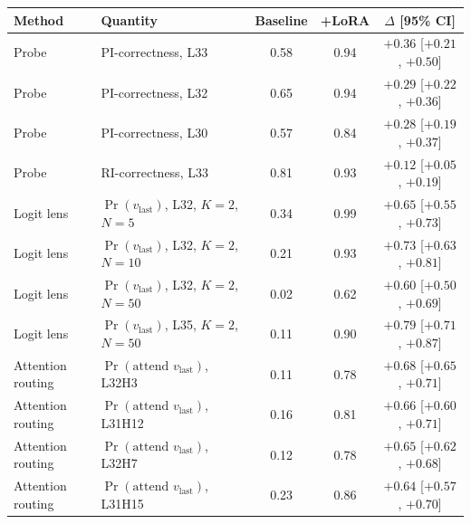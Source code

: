 \begin{tabular}{llccc}
\toprule
\textbf{Method} & \textbf{Quantity} & \textbf{Baseline} & \textbf{+LoRA} & \textbf{$\Delta$ [95\% CI]} \\
\midrule
Probe & PI-correctness, L33 & 0.58 & 0.94 & $+0.36$ [$+0.21$, $+0.50$] \\
Probe & PI-correctness, L32 & 0.65 & 0.94 & $+0.29$ [$+0.22$, $+0.36$] \\
Probe & PI-correctness, L30 & 0.57 & 0.84 & $+0.28$ [$+0.19$, $+0.37$] \\
Probe & RI-correctness, L33 & 0.81 & 0.93 & $+0.12$ [$+0.05$, $+0.19$] \\
\midrule
Logit lens & $\Pr(v_{\text{last}})$, L32, $K{=}2$, $N{=}5$  & 0.34 & 0.99 & $+0.65$ [$+0.55$, $+0.73$] \\
Logit lens & $\Pr(v_{\text{last}})$, L32, $K{=}2$, $N{=}10$ & 0.21 & 0.93 & $+0.73$ [$+0.63$, $+0.81$] \\
Logit lens & $\Pr(v_{\text{last}})$, L32, $K{=}2$, $N{=}50$ & 0.02 & 0.62 & $+0.60$ [$+0.50$, $+0.69$] \\
Logit lens & $\Pr(v_{\text{last}})$, L35, $K{=}2$, $N{=}50$ & 0.11 & 0.90 & $+0.79$ [$+0.71$, $+0.87$] \\
\midrule
Attention routing & $\Pr(\text{attend } v_{\text{last}})$, L32H3  & 0.11 & 0.78 & $+0.68$ [$+0.65$, $+0.71$] \\
Attention routing & $\Pr(\text{attend } v_{\text{last}})$, L31H12 & 0.16 & 0.81 & $+0.66$ [$+0.60$, $+0.71$] \\
Attention routing & $\Pr(\text{attend } v_{\text{last}})$, L32H7  & 0.12 & 0.78 & $+0.65$ [$+0.62$, $+0.68$] \\
Attention routing & $\Pr(\text{attend } v_{\text{last}})$, L31H15 & 0.23 & 0.86 & $+0.64$ [$+0.57$, $+0.70$] \\
\bottomrule
\end{tabular}
